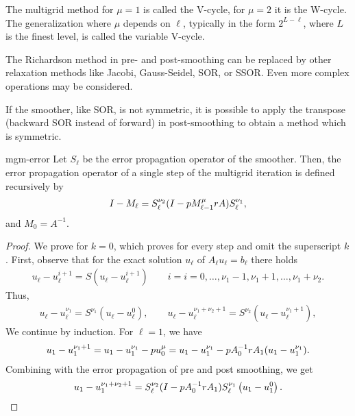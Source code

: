 \begin{remark}
  The multigrid method for $\mu=1$ is called the V-cycle, for $\mu=2$
  it is the W-cycle. The generalization where $\mu$ depends on $\ell$,
  typically in the form $2^{L-\ell}$, where $L$ is the finest level,
  is called the variable V-cycle.
\end{remark}

\begin{remark}
  The Richardson method in pre- and post-smoothing can be replaced by
  other relaxation methods like Jacobi, Gauss-Seidel, SOR, or
  SSOR. Even more complex operations may be considered.

  If the smoother, like SOR, is not symmetric, it is possible to apply
  the transpose (backward SOR instead of forward) in post-smoothing to
  obtain a method which is symmetric.
\end{remark}

\begin{Lemma}{mgm-error}
  Let $S_\ell$ be the error propagation operator of the
  smoother. Then, the error propagation operator of a single step of
  the multigrid iteration is defined recursively by
  \begin{gather}
    I - M_\ell = S_\ell^{\nu_2}
    (I-p M_{\ell-1}^{\mu}r A)
    S_\ell^{\nu_1},
  \end{gather}
  and $M_0 = A^{-1}$.
\end{Lemma}

\begin{proof}
  We prove for $k=0$, which proves for every step and omit the superscript $k$.
  First, observe that for the exact solution $u_\ell$ of
  $A_\ell u_\ell = b_\ell$ there holds
  \begin{gather*}
    u_\ell - u_\ell^{i+1}
    = S \left(u_\ell - u_\ell^{i+1}\right)
    \qquad i=i=0,\dots,\nu_1-1,\nu_1+1,\dots,\nu_1+\nu_2.
  \end{gather*}
  Thus,
  \begin{gather*}
    u_\ell - u_\ell^{\nu_1} = S^{\nu_1}(u_\ell - u_\ell^{0}),
    \qquad
    u_\ell - u_\ell^{\nu_1+\nu_2+1}
    = S^{\nu_2}(u_\ell - u_\ell^{\nu_1+1}),
  \end{gather*}
  We continue by induction. For $\ell=1$, we have
  \begin{gather*}
    u_1-u_1^{\nu_1+1}
    = u_1-u_1^{\nu_1} - p u_{0}^{\mu}
    = u_1-u_1^{\nu_1} - p A_0^{-1}
     r A_1(u_1-u_1^{\nu_1}).
   \end{gather*}
   Combining with the error propagation of pre and post smoothing, we
   get
  \begin{gather*}
    u_1 -u_1^{\nu_1+\nu_2+1}
    = S_\ell^{\nu_2}
    (I-p A_0^{-1} r A_1)
    S_\ell^{\nu_1} \left(u_1 -u_1^{0}\right).
  \end{gather*}
\end{proof}

